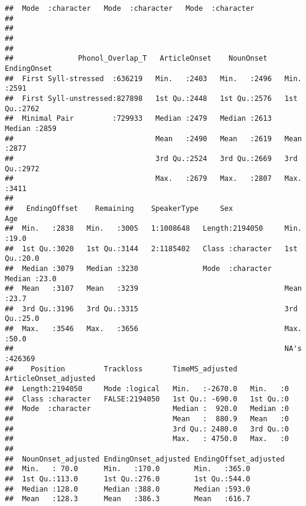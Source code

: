 \documentclass[
]{article}
\begin{document}
\begin{verbatim}
##  Mode  :character   Mode  :character   Mode  :character                   
##                                                                           
##                                                                           
##                                                                           
##                                                                           
##               Phonol_Overlap_T   ArticleOnset    NounOnset     EndingOnset  
##  First Syll-stressed  :636219   Min.   :2403   Min.   :2496   Min.   :2591  
##  First Syll-unstressed:827898   1st Qu.:2448   1st Qu.:2576   1st Qu.:2762  
##  Minimal Pair         :729933   Median :2479   Median :2613   Median :2859  
##                                 Mean   :2490   Mean   :2619   Mean   :2877  
##                                 3rd Qu.:2524   3rd Qu.:2669   3rd Qu.:2972  
##                                 Max.   :2679   Max.   :2807   Max.   :3411  
##                                                                             
##   EndingOffset    Remaining    SpeakerType     Sex                 Age        
##  Min.   :2838   Min.   :3005   1:1008648   Length:2194050     Min.   :19.0    
##  1st Qu.:3020   1st Qu.:3144   2:1185402   Class :character   1st Qu.:20.0    
##  Median :3079   Median :3230               Mode  :character   Median :23.0    
##  Mean   :3107   Mean   :3239                                  Mean   :23.7    
##  3rd Qu.:3196   3rd Qu.:3315                                  3rd Qu.:25.0    
##  Max.   :3546   Max.   :3656                                  Max.   :50.0    
##                                                               NA's   :426369  
##    Position         Trackloss       TimeMS_adjusted   ArticleOnset_adjusted
##  Length:2194050     Mode :logical   Min.   :-2670.0   Min.   :0            
##  Class :character   FALSE:2194050   1st Qu.: -690.0   1st Qu.:0            
##  Mode  :character                   Median :  920.0   Median :0            
##                                     Mean   :  880.9   Mean   :0            
##                                     3rd Qu.: 2480.0   3rd Qu.:0            
##                                     Max.   : 4750.0   Max.   :0            
##                                                                            
##  NounOnset_adjusted EndingOnset_adjusted EndingOffset_adjusted
##  Min.   : 70.0      Min.   :170.0        Min.   :365.0        
##  1st Qu.:113.0      1st Qu.:276.0        1st Qu.:544.0        
##  Median :128.0      Median :388.0        Median :593.0        
##  Mean   :128.3      Mean   :386.3        Mean   :616.7        

\end{verbatim}
\end{document}
